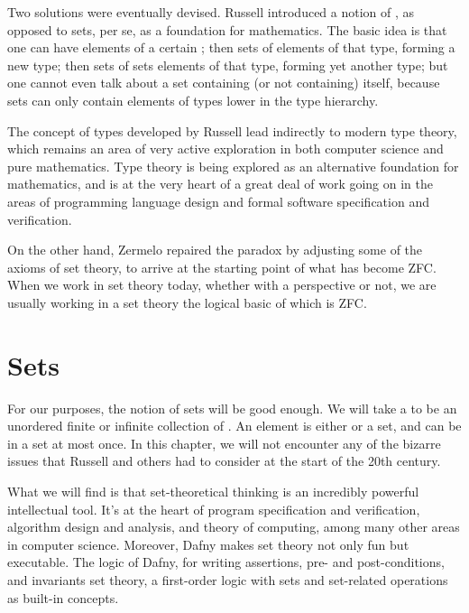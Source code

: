 \documentclass[letterpaper,10pt,english]{sphinxmanual}
\begin{document}
Two solutions were eventually devised. Russell introduced a notion of
, as opposed to sets, per se, as a foundation for mathematics.
The basic idea is that one can have elements of a certain ; then
sets of elements of that type, forming a new type; then sets of sets
elements of that type, forming yet another type; but one cannot even
talk about a set containing (or not containing) itself, because sets
can only contain elements of types lower in the type hierarchy.

The concept of types developed by Russell lead indirectly to modern
type theory, which remains an area of very active exploration in both
computer science and pure mathematics. Type theory is being explored
as an alternative foundation for mathematics, and is at the very heart
of a great deal of work going on in the areas of programming language
design and formal software specification and verification.

On the other hand, Zermelo repaired the paradox by adjusting some of
the axioms of set theory, to arrive at the starting point of what has
become ZFC. When we work in set theory today, whether with a 
perspective or not, we are usually working in a set theory the logical
basic of which is ZFC.


\section{Sets}
\label{\detokenize{07-set-theory:sets}}
For our purposes, the  notion of sets will be good enough. We
will take a  to be an unordered finite or infinite collection of
. An element is either  or  a set, and can be in
a set at most once.  In this chapter, we will not encounter any of the
bizarre issues that Russell and others had to consider at the start of
the 20th century.

What we will find is that set-theoretical thinking is an incredibly
powerful intellectual tool. It’s at the heart of program specification
and verification, algorithm design and analysis, and theory of
computing, among many other areas in computer science. Moreover, Dafny
makes set theory not only fun but executable. The logic of Dafny, for
writing assertions, pre- and post-conditions, and invariants  set
theory, a first-order logic with sets and set-related operations as
built-in concepts.
\end{document}

